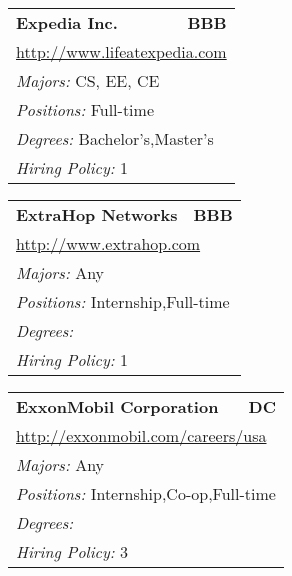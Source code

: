 \documentclass[twoside]{article}
\begin{document}
\begin{center}
\begin{multicols}{3}
\begin{FlushLeft}
\begin{minipage}{.9\columnwidth}
\end{minipage}
 
\begin{minipage}{.9\columnwidth}\begin{tabularx}{.95\columnwidth}{Xr}
                 {\Large\bf Expedia Inc.} & {\Large\bf BBB}\\
    \multicolumn{2}{p{.95\columnwidth}}{\url{http://www.lifeatexpedia.com}}\\
    \multicolumn{2}{p{.95\columnwidth}}{\emph{Majors:} CS, EE, CE}\\
    \multicolumn{2}{p{.95\columnwidth}}{\emph{Positions:} Full-time}\\
    \multicolumn{2}{p{.95\columnwidth}}{\emph{Degrees:} Bachelor's,Master's}\\
    \multicolumn{2}{p{.95\columnwidth}}{\emph{Hiring Policy:} 1}\\
    \end{tabularx}
    
\end{minipage}
 
\begin{minipage}{.9\columnwidth}\begin{tabularx}{.95\columnwidth}{Xr}
                 {\Large\bf ExtraHop Networks} & {\Large\bf BBB}\\
    \multicolumn{2}{p{.95\columnwidth}}{\url{http://www.extrahop.com}}\\
    \multicolumn{2}{p{.95\columnwidth}}{\emph{Majors:} Any}\\
    \multicolumn{2}{p{.95\columnwidth}}{\emph{Positions:} Internship,Full-time}\\
    \multicolumn{2}{p{.95\columnwidth}}{\emph{Degrees:} }\\
    \multicolumn{2}{p{.95\columnwidth}}{\emph{Hiring Policy:} 1}\\
    \end{tabularx}
    
\end{minipage}
 
\begin{minipage}{.9\columnwidth}\begin{tabularx}{.95\columnwidth}{Xr}
                 {\Large\bf ExxonMobil Corporation} & {\Large\bf DC}\\
    \multicolumn{2}{p{.95\columnwidth}}{\url{http://exxonmobil.com/careers/usa}}\\
    \multicolumn{2}{p{.95\columnwidth}}{\emph{Majors:} Any}\\
    \multicolumn{2}{p{.95\columnwidth}}{\emph{Positions:} Internship,Co-op,Full-time}\\
    \multicolumn{2}{p{.95\columnwidth}}{\emph{Degrees:} }\\
    \multicolumn{2}{p{.95\columnwidth}}{\emph{Hiring Policy:} 3}\\
    \end{tabularx}
    

\end{minipage}
\end{FlushLeft}
\end{multicols}
\end{center}
\end{document}
